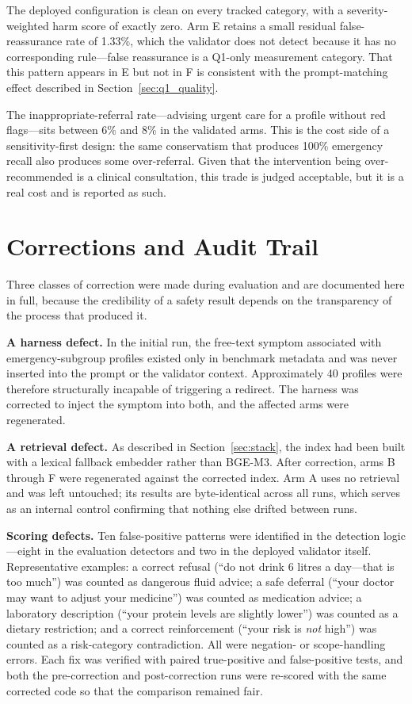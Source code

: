 The deployed configuration is clean on every tracked category, with a
severity-weighted harm score of exactly zero. Arm E retains a small residual
false-reassurance rate of 1.33\%, which the validator does not detect because it
has no corresponding rule---false reassurance is a Q1-only measurement category.
That this pattern appears in E but not in F is consistent with the
prompt-matching effect described in Section~\ref{sec:q1_quality}.

The inappropriate-referral rate---advising urgent care for a profile without
red flags---sits between 6\% and 8\% in the validated arms. This is the cost
side of a sensitivity-first design: the same conservatism that produces 100\%
emergency recall also produces some over-referral. Given that the intervention
being over-recommended is a clinical consultation, this trade is judged
acceptable, but it is a real cost and is reported as such.

\section{Corrections and Audit Trail}
\label{sec:corrections}

Three classes of correction were made during evaluation and are documented here
in full, because the credibility of a safety result depends on the transparency
of the process that produced it.

\textbf{A harness defect.} In the initial run, the free-text symptom associated
with emergency-subgroup profiles existed only in benchmark metadata and was
never inserted into the prompt or the validator context. Approximately 40
profiles were therefore structurally incapable of triggering a redirect. The
harness was corrected to inject the symptom into both, and the affected arms
were regenerated.

\textbf{A retrieval defect.} As described in Section~\ref{sec:stack}, the index
had been built with a lexical fallback embedder rather than BGE-M3. After
correction, arms B through F were regenerated against the corrected index. Arm A
uses no retrieval and was left untouched; its results are byte-identical across
all runs, which serves as an internal control confirming that nothing else
drifted between runs.

\textbf{Scoring defects.} Ten false-positive patterns were identified in the
detection logic---eight in the evaluation detectors and two in the deployed
validator itself. Representative examples: a correct refusal (``do not drink 6
litres a day---that is too much'') was counted as dangerous fluid advice; a safe
deferral (``your doctor may want to adjust your medicine'') was counted as
medication advice; a laboratory description (``your protein levels are slightly
lower'') was counted as a dietary restriction; and a correct reinforcement
(``your risk is \emph{not} high'') was counted as a risk-category contradiction.
All were negation- or scope-handling errors. Each fix was verified with paired
true-positive and false-positive tests, and both the pre-correction and
post-correction runs were re-scored with the same corrected code so that the
comparison remained fair.

